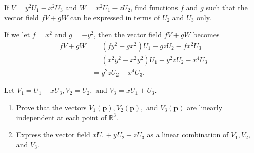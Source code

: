 \documentclass[10pt]{report}
\begin{document}

\begin{exer}[1.2.4]
	If $V=y^2U_1-x^2U_3$ and $W=x^2U_1-zU_2$, find functions $f$ and $g$ such that the vector field $fV+gW$ can be expressed in terms of $U_2$ and $U_3$ only.
\end{exer}
If we let $f=x^2$ and $g=-y^2$, then the vector field $fV + gW$ becomes
\begin{align*}
	fV+gW &= (fy^2 + gx^2)U_1-gzU_2-fx^2U_3 \\
	      &= (x^2y^2 - x^2y^2)U_1 + y^2zU_2-x^4U_3 \\
	      &= y^2zU_2-x^4U_3.
\end{align*}

\begin{exer}[1.2.5]
	Let $V_1=U_1-xU_3, V_2=U_2,$ and $V_3=xU_1+U_3.$ 
	\begin{enumerate}
		\item Prove that the vectors $V_1(\mathbf{p}), V_2(\mathbf{p}),$ and $V_3(\mathbf{p})$ are linearly independent at each point of $\mathbb{R}^3$.
		\item Express the vector field $xU_1+yU_2+zU_3$ as a linear combination of $V_1,V_2,$ and $V_3.$
	\end{enumerate}
\end{exer}
\end{document}

